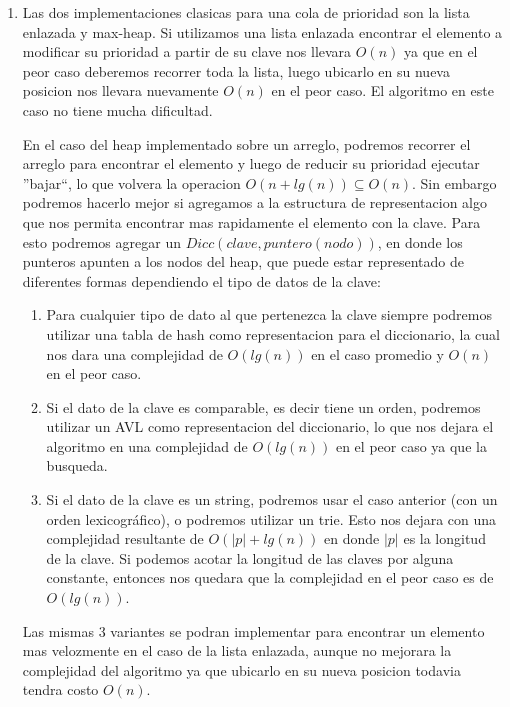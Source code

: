 \documentclass[10pt, a4paper]{article}
\begin{document}
\begin{enumerate}
 \item  Las dos implementaciones clasicas para una cola de prioridad son la lista enlazada y max-heap. Si utilizamos una lista enlazada encontrar el elemento a modificar su prioridad a partir de su clave nos llevara $O(n)$ ya que en el peor caso deberemos recorrer toda la lista, luego ubicarlo en su nueva posicion nos llevara nuevamente $O(n)$ en el peor caso. El algoritmo en este caso no tiene mucha dificultad.
 
 En el caso del heap implementado sobre un arreglo, podremos recorrer el arreglo para encontrar el elemento y luego de reducir su prioridad ejecutar ''bajar``, lo que volvera la operacion $O(n+lg(n))\subseteq O(n)$. Sin embargo podremos hacerlo mejor si agregamos a la estructura de representacion algo que nos permita encontrar mas rapidamente el elemento con la clave. Para esto podremos agregar un $Dicc(clave, puntero(nodo))$, en donde los punteros apunten a los nodos del heap, que puede estar representado de diferentes formas dependiendo el tipo de datos de la clave:
 
 \begin{enumerate}
  \item Para cualquier tipo de dato al que pertenezca la clave siempre podremos utilizar una tabla de hash como representacion para el diccionario, la cual nos dara una complejidad de $O(lg(n))$ en el caso promedio y $O(n)$ en el peor caso.
  \item Si el dato de la clave es comparable, es decir tiene un orden, podremos utilizar un AVL como representacion del diccionario, lo que nos dejara el algoritmo en una complejidad de $O(lg(n))$ en el peor caso ya que la busqueda.
  \item Si el dato de la clave es un string, podremos usar el caso anterior (con un orden lexicogr\'afico), o podremos utilizar un trie. Esto nos dejara con una complejidad resultante de $O(|p|+lg(n))$ en donde $|p|$ es la longitud de la clave. Si podemos acotar la longitud de las claves por alguna constante, entonces nos quedara que la complejidad en el peor caso es de $O(lg(n))$.
 \end{enumerate}
 
 Las mismas 3 variantes se podran implementar para encontrar un elemento mas velozmente en el caso de la lista enlazada, aunque no mejorara la complejidad del algoritmo ya que ubicarlo en su nueva posicion todavia tendra costo $O(n)$.


\end{enumerate}
\end{document}
